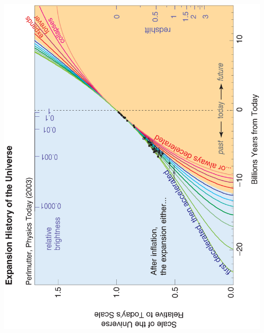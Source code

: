 \documentclass[12pt]{article}
\begin{document}
\begin{minipage}{\linewidth}
  \vspace{-1.5 cm}
  \hspace{-1.5 cm} \includegraphics[width=1.1\linewidth, angle=180]{scp_hubblediag2.eps} \hspace{-1.5 cm}
\end{minipage}

\pagebreak
\end{document}
